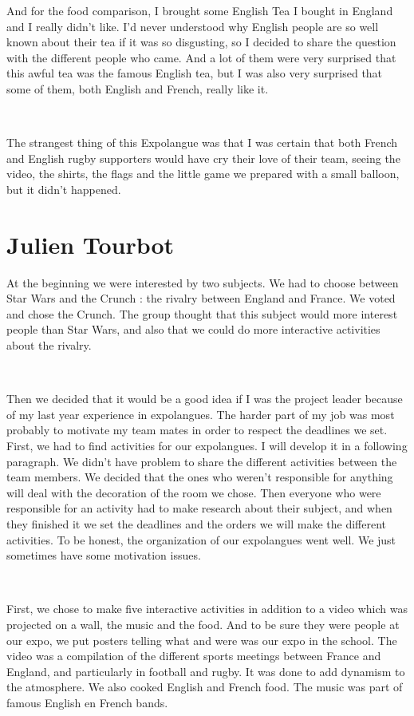 \documentclass[11pt;a4paper]{report}
\begin{document}
        And for the food comparison, I brought some English Tea I bought in England and I really didn't like. I'd never understood why English people are so well known about their tea if it was so disgusting, so I decided to share the question with the different people who came. And a lot of them were very surprised that this awful tea was the famous English tea, but I was also very surprised that some of them, both English and French, really like it.

        ~

        The strangest thing of this Expolangue was that I was certain that both French and English rugby supporters would have cry their love of their team, seeing the video, the shirts, the flags and the little game we prepared with a small balloon, but it didn't happened.

\newpage
  \section{Julien Tourbot}
    At the beginning we were interested by two subjects. We had to choose between Star Wars and the Crunch : the rivalry between England and France. We voted and chose the Crunch. The group thought that this subject would more interest people than Star Wars, and also that we could do more interactive activities about the rivalry.

~

    Then we decided that it would be a good idea if I was the project leader because of my last year experience in expolangues. The harder part of my job was most probably to motivate my team mates in order to respect the deadlines we set.
First, we had to find activities for our expolangues. I will develop it in a following paragraph.
We didn't have problem to share the different activities between the team members. We decided that the ones who weren't responsible for anything will deal with the decoration of the room we chose. Then everyone who were responsible for an activity had to make research about their subject, and when they finished it we set the deadlines and the orders we will make the different activities.
To be honest, the organization of our expolangues went well. We just sometimes have some motivation issues.

~

    First, we chose to make five interactive activities in addition to a video which was projected on a wall,  the music and the food. And to be sure they were people at our expo, we put posters telling what and were was our expo in the school.
The video was a compilation of the different sports meetings between France and England, and particularly in football and rugby. It was done to add dynamism to the atmosphere. We also cooked English and French food.
The music was part of famous English en French bands.
\end{document}

